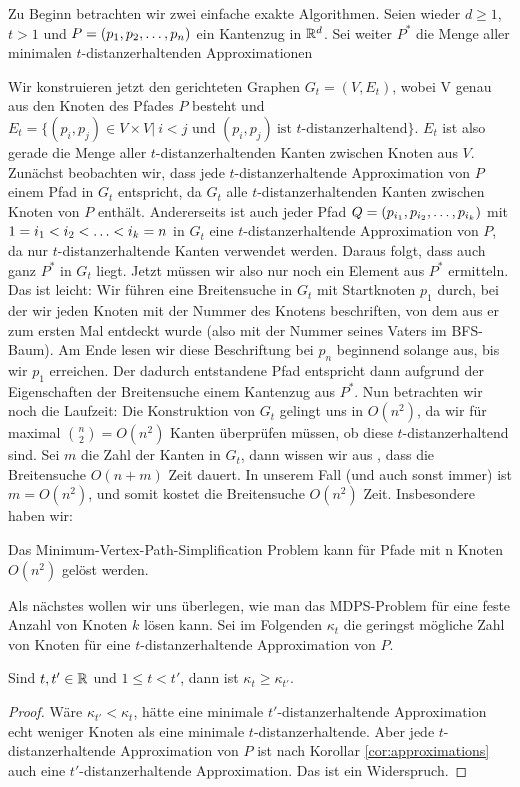 	Zu Beginn betrachten wir zwei einfache exakte Algorithmen.
    Seien wieder $d\geq1$, $t>1$ und $P = (p_1, p_2, \mathellipsis, p_n)$ ein Kantenzug in $\mathbb{R}^d$. Sei weiter $P^*$ die Menge aller minimalen $t$-distanzerhaltenden Approximationen
    
    Wir konstruieren jetzt den gerichteten Graphen $G_t = (V,E_t)$, wobei V genau aus den Knoten des Pfades $P$ besteht und 
    $E_t = \{(p_i, p_j) \in V\times V|\ i < j \text{ und } (p_i,p_j)\ \text{ist $t$-distanzerhaltend}\}$. $E_t$ ist also gerade die Menge aller $t$-distanzerhaltenden Kanten zwischen Knoten aus $V$. Zunächst beobachten wir, dass jede $t$-distanzerhaltende Approximation von $P$ einem Pfad in $G_t$ entspricht, da $G_t$ alle $t$-distanzerhaltenden Kanten zwischen Knoten von $P$ enthält. Andererseits ist auch jeder Pfad $Q = (p_{i_1}, p_{i_2}, \mathellipsis, p_{i_k})$ mit $1 = i_1 < i_2 < \mathellipsis < i_k = n$ in $G_t$ eine $t$-distanzerhaltende Approximation von $P$, da nur $t$-distanzerhaltende Kanten verwendet werden. Daraus folgt, dass auch ganz $P^*$ in $G_t$ liegt. Jetzt müssen wir also nur noch ein Element aus $P^*$ ermitteln. Das ist leicht: Wir führen eine Breitensuche in $G_t$ mit Startknoten $p_1$ durch, bei der wir jeden Knoten mit der Nummer des Knotens beschriften, von dem aus er zum ersten Mal entdeckt wurde (also mit der Nummer seines Vaters im BFS-Baum). Am Ende lesen wir diese Beschriftung bei $p_n$ beginnend solange aus, bis wir $p_1$ erreichen. Der dadurch entstandene Pfad entspricht dann aufgrund der Eigenschaften der Breitensuche einem Kantenzug aus $P^*$. 
    Nun betrachten wir noch die Laufzeit: Die Konstruktion von $G_t$ gelingt uns in $O(n^2)$, da wir für maximal $\binom{n}{2} = O(n^2)$ Kanten überprüfen müssen, ob diese $t$-distanzerhaltend sind. Sei $m$ die Zahl der Kanten in $G_t$, dann wissen wir aus  \cite{hagerup}, dass die Breitensuche $O(n+m)$ Zeit dauert. In unserem Fall (und auch sonst immer) ist $m = O(n^2)$, und somit kostet die Breitensuche $O(n^2)$ Zeit. Insbesondere haben wir:
    \begin{theorem}
    	\label{theo:mvpsex}
    	Das Minimum-Vertex-Path-Simplification Problem kann für Pfade mit n Knoten $O(n^2)$ gelöst werden.
    \end{theorem} 
    
    Als nächstes wollen wir uns überlegen, wie man das MDPS-Problem für eine feste Anzahl von Knoten $k$ lösen kann. Sei im Folgenden $\kappa_t$ die geringst mögliche Zahl von Knoten für eine $t$-distanzerhaltende Approximation von $P$.
	\begin{lemma}
		\label{lem:kappa}
		Sind $t, t' \in \mathbb{R}$ und $1 \leq t < t'$, dann ist $\kappa_t \geq \kappa_{t'}$.
	\end{lemma}
	\begin{proof}
		Wäre $\kappa_{t'} < \kappa_t$, hätte eine minimale $t'$-distanzerhaltende Approximation echt weniger Knoten als eine minimale $t$-distanzerhaltende. Aber jede $t$-distanzerhaltende Approximation von $P$ ist nach Korollar \ref{cor:approximations} auch eine $t'$-distanzerhaltende Approximation. Das ist ein Widerspruch. 
	\end{proof}
	
